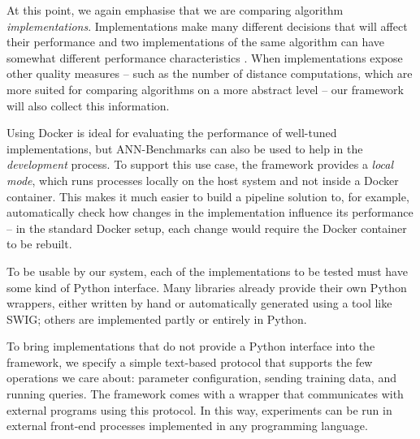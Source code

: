 At this point, we again emphasise that we are comparing algorithm
\emph{implementations}. Implementations make many different decisions that will
affect their performance and two implementations of the same algorithm
can have somewhat different performance characteristics \cite{KriegelSZ17}.
When implementations expose other quality measures -- such as the number of
distance computations, which are more suited for comparing algorithms on a
more abstract level -- our framework will also collect this information.

\medskip
{}
Using Docker is ideal for evaluating the performance of well-tuned
implementations, but ANN-Benchmarks can also be used to help in the \emph{development} process.
To support this use case, the framework provides a \emph{local mode}, which
runs processes locally on the host system and not inside a Docker container.
This makes it much easier to build a pipeline solution to, for example,
automatically check how changes in the implementation influence its performance
-- in the standard Docker setup, each change would require the Docker container to be rebuilt.

\medskip
{}
To be usable by our system, each of the implementations to be tested
must have some kind of Python interface. Many libraries already
provide their own Python wrappers, either written by hand or automatically
generated using a tool like SWIG; others are implemented partly or entirely
in Python.



To bring implementations that do not provide a Python interface into the
framework,
we specify a simple text-based protocol that supports the few operations we
care about: parameter configuration,
sending training data, and running queries. The framework comes with a wrapper
that communicates with external programs using this protocol.
In this way, experiments can be run in
external front-end processes implemented in any programming language.

